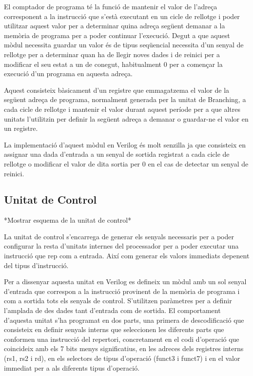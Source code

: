 \documentclass[10pt,a4paper,twocolumn,twoside]{article}
\begin{document}
    El comptador de programa té la funció de mantenir el valor de l'adreça corresponent a la instrucció que s'està executant en un cicle de rellotge i poder utilitzar aquest valor per a determinar quina adreça següent demanar a la memòria de programa per a poder continuar l'execució.
    Degut a que aquest mòdul necessita guardar un valor és de tipus seqüencial necessita d'un senyal de rellotge per a determinar quan ha de llegir noves dades i de reinici  per a modificar el seu estat a un de conegut, habitualment 0 per a començar la execució d'un programa en aquesta adreça. 
    
    Aquest consisteix bàsicament d'un registre que emmagatzema el valor de la següent adreça de programa, normalment generada per la unitat de Branching, a cada cicle de rellotge i mantenir el valor durant aquest període per a que altres unitats l'utilitzin per definir la següent adreça a demanar o guardar-ne el valor en un registre.
    
    La implementació d'aquest mòdul en Verilog és molt senzilla ja que consisteix en assignar una dada d'entrada a un senyal de sortida registrat a cada cicle de rellotge o modificar el valor de dita sortia per 0 en el cas de detectar un senyal de reinici. 
    
    
    \subsection{Unitat de Control}
    *Mostrar esquema de la unitat de control*
    
    La unitat de control s'encarrega de generar els senyals necessaris per a poder configurar la resta d'unitats internes del processador per a poder executar una instrucció que rep com a entrada. Així com generar els valors immediats depenent del tipus d'instrucció. 
    
    Per a dissenyar aquesta unitat en Verilog es defineix un mòdul amb un sol senyal d'entrada que correspon a la instrucció provinent de la memòria de programa i com a sortida tots els senyals de control. S'utilitzen paràmetres per a definir l'amplada de des dades tant d'entrada com de sortida.
    El comportament d'aquesta unitat s'ha programat en dos parts, una primera de descodificació que consisteix en definir senyals interns que seleccionen les diferents parts que conformen una instrucció del repertori, concretament en el codi d'operació que coincideix amb els 7 bits menys significatius, en les adreces dels registres interns (rs1, rs2 i rd), en els selectors de tipus d'operació (funct3 i funct7) i en el valor immediat per a als diferents tipus d'operació.
    
\end{document}
